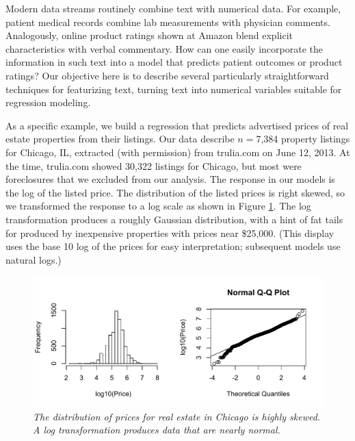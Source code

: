 \documentclass[12pt]{article}
\begin{document}
 \clearpage


 Modern data streams routinely combine text with numerical data.  For example,
 patient medical records combine lab measurements with physician comments.
  Analogously, online product ratings shown at Amazon blend explicit
 characteristics with verbal commentary.  How can one easily incorporate the
 information in such text into a model that predicts patient outcomes or product
 ratings?  Our objective here is to describe several particularly
 straightforward techniques for featurizing text, turning text into numerical
 variables suitable for regression modeling.
 
 
 As a specific example, we build a regression that predicts advertised prices
 of real estate properties from their listings.  Our data describe $n=$7,384
 property listings for Chicago, IL, extracted (with permission) from trulia.com
 on June 12, 2013.  At the time, trulia.com showed 30,322 listings for Chicago,
 but most were foreclosures that we excluded from our analysis.  The response in
 our models is the log of the listed price.  The distribution of the listed
 prices is right skewed, so we transformed the response to a log scale as shown
 in Figure \ref{fig:prices}.  The log transformation produces a roughly Gaussian
 distribution, with a hint of fat tails for produced by inexpensive properties
 with prices near \$25,000.  (This display uses the base 10 log of the prices
 for easy interpretation; subsequent models use natural logs.)
 
 
 \begin{figure}
 \caption{ \label{fig:prices} { \sl The distribution of prices for real estate
 in Chicago is highly skewed.  A log transformation produces data that are
 nearly normal.}  }
 \centerline{
 \vspace{0.1in}
 \includegraphics[width=5in]{figures/prices} }
 \vspace{0.2in}
 \end{figure}
\end{document}
